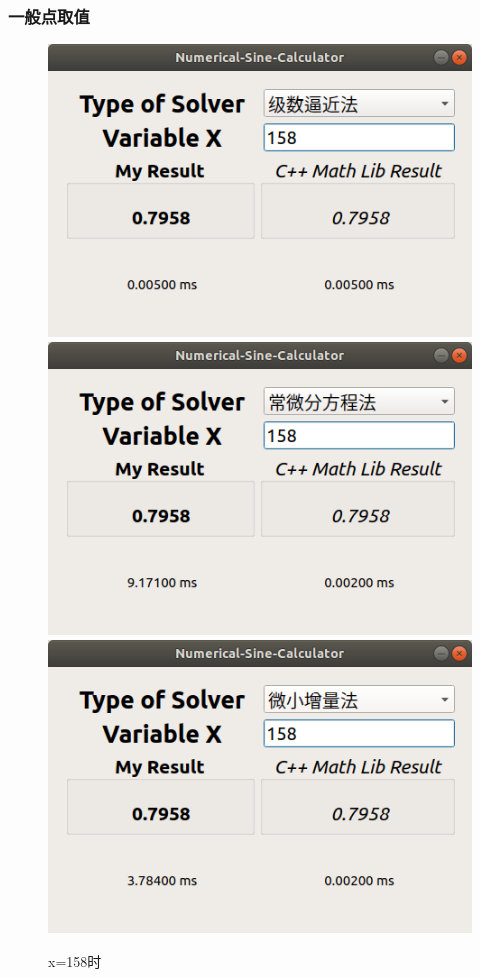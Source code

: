 \documentclass[UTF8]{ctexart}
\begin{document}
\subsubsection{一般点取值}

\begin{figure}[H]
    \centering
    \includegraphics[scale=0.25]{images/series158.png}
    \includegraphics[scale=0.25]{images/diff158.png}
    \includegraphics[scale=0.25]{images/delta158.png}
    \caption{x=158时}
\end{figure}
\end{document}
